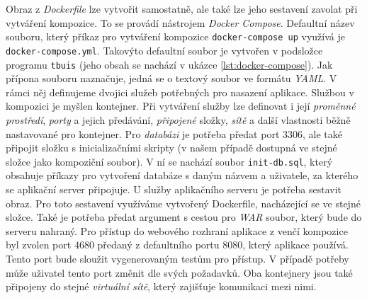 \documentclass[czech, ma, kiv, he, iso690numb, pdf, viewonly]{fasthesis}
\begin{document}
    Obraz z \textit{Dockerfile} lze vytvořit samostatně, ale také lze jeho sestavení zavolat při vytváření kompozice. To se provádí nástrojem \textit{Docker Compose}. Defaultní název souboru, který příkaz pro vytváření kompozice \verb|docker-compose up| využívá je \verb|docker-compose.yml|. Takovýto defaultní soubor je vytvořen v podsložce programu \verb|tbuis| (jeho obsah se nachází v ukázce \ref{lst:docker-compose}). Jak přípona souboru naznačuje, jedná se o textový soubor ve formátu \textit{YAML}. V rámci něj definujeme dvojici služeb potřebných pro nasazení aplikace. Službou v kompozici je myšlen kontejner. Při vytváření služby lze definovat i její \textit{proměnné prostředí}, \textit{porty} a jejich předávání, \textit{připojené} složky, \textit{sítě} a další vlastnosti běžně nastavované pro kontejner. Pro \textit{databázi} je potřeba předat port \(3306\), ale také připojit složku s inicializačními skripty (v našem případě dostupná ve stejné složce jako kompoziční soubor). V ní se nachází soubor \verb|init-db.sql|, který obsahuje příkazy pro vytvoření databáze s daným názvem a uživatele, za kterého se aplikační server připojuje. U služby aplikačního serveru je potřeba sestavit obraz. Pro toto sestavení využíváme vytvořený Dockerfile, nacházející se ve stejné složce. Také je potřeba předat argument s cestou pro \textit{WAR} soubor, který bude do serveru nahraný. Pro přístup do webového rozhraní aplikace z venčí kompozice byl zvolen port \(4680\) předaný z defaultního portu \(8080\), který aplikace používá. Tento port bude sloužit vygenerovaným testům pro přístup. V případě potřeby může uživatel tento port změnit dle svých požadavků. Oba kontejnery jsou také připojeny do stejné \textit{virtuální sítě}, který zajišťuje komunikaci mezi nimi. 

\end{document}
